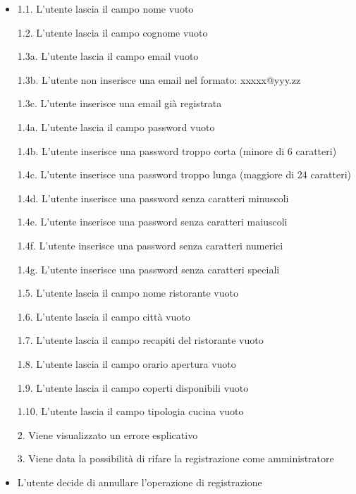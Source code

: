 \begin{itemize}
    \item 1.1.  L'utente lascia il campo nome vuoto
    
    1.2.  L'utente lascia il campo cognome vuoto
    
    1.3a.  L'utente lascia il campo email vuoto
    
    1.3b.  L'utente non inserisce una email nel formato: xxxxx@yyy.zz
    
    1.3c.  L'utente inserisce una email già registrata
    
    1.4a.  L'utente lascia il campo password vuoto
    
    1.4b.  L'utente inserisce una password troppo corta (minore di 6 caratteri)
    
    1.4c.  L'utente inserisce una password troppo lunga (maggiore di 24 caratteri)
    
    1.4d.  L'utente inserisce una password senza caratteri minuscoli
    
    1.4e.  L'utente inserisce una password senza caratteri maiuscoli
    
    1.4f.  L'utente inserisce una password senza caratteri numerici
    
    1.4g.  L'utente inserisce una password senza caratteri speciali

    1.5.  L'utente lascia il campo nome ristorante vuoto

    1.6.  L'utente lascia il campo città vuoto
    
    1.7.  L'utente lascia il campo recapiti del ristorante vuoto
    
    1.8.  L'utente lascia il campo orario apertura vuoto
    
    1.9.  L'utente lascia il campo coperti disponibili vuoto
    
    1.10.  L'utente lascia il campo tipologia cucina vuoto
    
    2.  Viene visualizzato un errore esplicativo
    
    3.  Viene data la possibilità di rifare la registrazione come amministratore
    \item L'utente decide di annullare l'operazione di registrazione
\end{itemize}